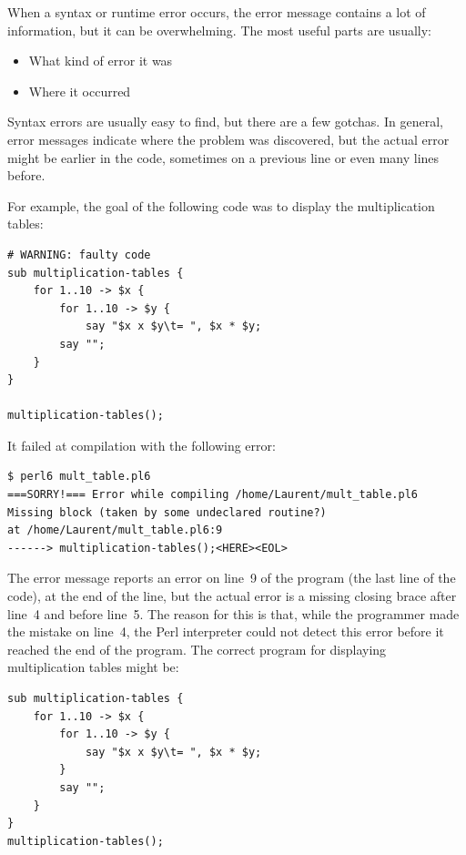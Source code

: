 When a syntax or runtime error occurs, the error message contains
a lot of information, but it can be overwhelming.  The most
useful parts are usually:

\begin{itemize}

\item What kind of error it was

\item Where it occurred

\end{itemize}

Syntax errors are usually easy to find, but there are a few
gotchas. In general, error messages indicate where the problem 
was discovered, but the actual error might be earlier in 
the code, sometimes on a previous line or even many lines 
before.

For example, the goal of the following code was to display the 
multiplication tables:

\begin{verbatim}
# WARNING: faulty code
sub multiplication-tables {
    for 1..10 -> $x {
        for 1..10 -> $y {
            say "$x x $y\t= ", $x * $y;
        say "";
	}
}

multiplication-tables();
\end{verbatim}

It failed at compilation with the following error:

\begin{verbatim}
$ perl6 mult_table.pl6
===SORRY!=== Error while compiling /home/Laurent/mult_table.pl6
Missing block (taken by some undeclared routine?)
at /home/Laurent/mult_table.pl6:9
------> multiplication-tables();<HERE><EOL>
\end{verbatim}

The error message reports an error on line~9 of the program 
(the last line of the code), at the end of the line, but 
the actual error is a missing closing brace after line~4 
and before line~5. The reason for this is that, while the 
programmer made the mistake on line~4, the Perl interpreter 
could not detect this error before it reached the 
end of the program. The correct program for displaying 
multiplication tables might be:

\begin{verbatim}
sub multiplication-tables {
    for 1..10 -> $x {
        for 1..10 -> $y {
            say "$x x $y\t= ", $x * $y;
        }
        say "";
    }
}
multiplication-tables();
\end{verbatim}

